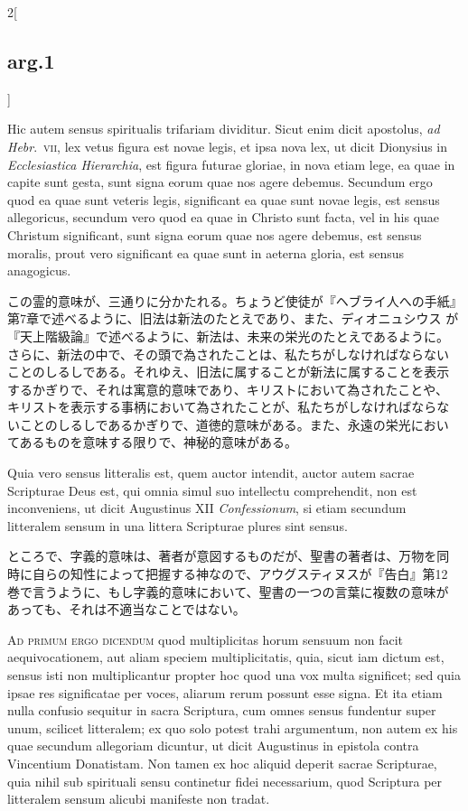 \documentclass[
paper=a4paper,
fontsize=10pt,
jafontsize=9pt,
titlepage
]{jlreq}
\begin{document}
\begin{paracol}{2}[\subsection{arg.1}]
\switchcolumn*

Hic autem sensus spiritualis trifariam dividitur. Sicut enim dicit
apostolus, {\itshape ad Hebr}.~{\scshape vii}, lex vetus figura est
novae legis, et ipsa nova lex, ut dicit Dionysius in {\itshape
Ecclesiastica Hierarchia}, est figura futurae gloriae, in nova etiam
lege, ea quae in capite sunt gesta, sunt signa eorum quae nos agere
debemus. Secundum ergo quod ea quae sunt veteris legis, significant ea
quae sunt novae legis, est sensus allegoricus, secundum vero quod ea
quae in Christo sunt facta, vel in his quae Christum significant, sunt
signa eorum quae nos agere debemus, est sensus moralis, prout vero
significant ea quae sunt in aeterna gloria, est sensus anagogicus.

\switchcolumn

この霊的意味が、三通りに分かたれる。ちょうど使徒が『ヘブライ人への手紙』
第7章で述べるように、旧法は新法のたとえであり、また、ディオニュシウス
が『天上階級論』で述べるように、新法は、未来の栄光のたとえであるように。
さらに、新法の中で、その頭で為されたことは、私たちがしなければならない
ことのしるしである。それゆえ、旧法に属することが新法に属することを表示
するかぎりで、それは寓意的意味であり、キリストにおいて為されたことや、
キリストを表示する事柄において為されたことが、私たちがしなければならな
いことのしるしであるかぎりで、道徳的意味がある。また、永遠の栄光におい
てあるものを意味する限りで、神秘的意味がある。

\switchcolumn*

Quia vero sensus litteralis est, quem auctor intendit, auctor autem
sacrae Scripturae Deus est, qui omnia simul suo intellectu
comprehendit, non est inconveniens, ut dicit Augustinus XII {\itshape
Confessionum}, si etiam secundum litteralem sensum in una littera
Scripturae plures sint sensus.

\switchcolumn

ところで、字義的意味は、著者が意図するものだが、聖書の著者は、万物を同
時に自らの知性によって把握する神なので、アウグスティヌスが『告白』第12
巻で言うように、もし字義的意味において、聖書の一つの言葉に複数の意味が
あっても、それは不適当なことではない。

\switchcolumn*[\subsection{ad.1}]

{\scshape Ad primum ergo dicendum} quod multiplicitas horum sensuum
non facit aequivocationem, aut aliam speciem multiplicitatis, quia,
sicut iam dictum est, sensus isti non multiplicantur propter hoc quod
una vox multa significet; sed quia ipsae res significatae per voces,
aliarum rerum possunt esse signa. Et ita etiam nulla confusio sequitur
in sacra Scriptura, cum omnes sensus fundentur super unum, scilicet
litteralem; ex quo solo potest trahi argumentum, non autem ex his quae
secundum allegoriam dicuntur, ut dicit Augustinus in epistola contra
Vincentium Donatistam. Non tamen ex hoc aliquid deperit sacrae
Scripturae, quia nihil sub spirituali sensu continetur fidei
necessarium, quod Scriptura per litteralem sensum alicubi manifeste
non tradat.


\end{paracol}
\end{document}
